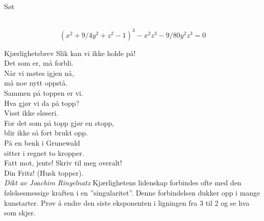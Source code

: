 \documentclass[no]{./../../common/SurferDesc}%
\begin{document}
\footnotesize


\begin{surferPage}
  \begin{surferTitle}Søt\end{surferTitle}   \\

\smallskip
\[(x^2+ 9/4y^2	+ z^2- 1)^3- x^2z^3	- 9/80y^2z^3	= 0\]

\singlespacing
Kjærlighetsbrev
\singlespacing
Slik kan vi ikke holde på!\\
Det som er, må forbli. \\
Når vi møtes igjen nå, \\
må noe nytt oppstå.\\
Sammen på toppen er vi.\\
Hva gjør vi da på topp?\\
Visst ikke sløseri.\\
For det som på topp gjør en stopp,\\
blir ikke så fort brukt opp.\\
På en benk i Grunewald\\
sitter i regnet to kropper.\\
Fatt mot, jente! Skriv til meg overalt!\\
Din Fritz! (Husk topper).\\
{\it Dikt av Joachim Ringelnatz}
\singlespacing 
Kjærlighetens lidenskap forbindes ofte med den følelsesmessige kraften i en ''singularitet''. Denne forbindelsen dukker opp i mange kunstarter.
\singlespacing 
Prøv å endre den siste eksponenten i ligningen fra 3 til 2 og se hva som skjer.



  \begin{surferText}
     \end{surferText}
\end{surferPage}
\end{document}
